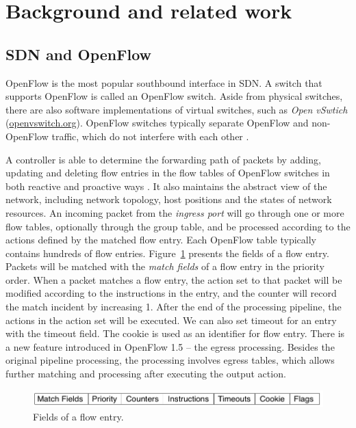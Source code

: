 \documentclass[conference]{IEEEtran}
\begin{document}
\section{Background and related work}
\subsection{SDN and OpenFlow}
\label{SDN and OpenFlow}
OpenFlow is the most popular southbound interface in SDN. A switch that supports OpenFlow is called an OpenFlow switch. Aside from physical switches, there are also software implementations of virtual switches, such as \textit{Open vSwtich} (\url{openvswitch.org}). OpenFlow switches typically separate OpenFlow and non-OpenFlow traffic, which do not interfere with each other \cite{HP_SPEC}.

A controller is able to determine the forwarding path of packets by adding, updating and deleting flow entries in the flow tables of OpenFlow switches in both reactive and proactive ways \cite{OF_SPEC}. It also maintains the abstract view of the network, including network topology, host positions and the states of network resources. An incoming packet from the \textit{ingress port} will go through one or more flow tables, optionally through the group table, and be processed according to the actions defined by the matched flow entry. Each OpenFlow table typically contains hundreds of flow entries. Figure~\ref{FE_Col} presents the fields of a flow entry. Packets will be matched with the \textit{match fields} of a flow entry in the priority order. When a packet matches a flow entry, the action set to that packet will be modified according to the instructions in the entry, and the counter will record the match incident by increasing 1. After the end of the processing pipeline, the actions in the action set will be executed. We can also set timeout for an entry with the timeout field. The cookie is used as an identifier for flow entry. There is a new feature introduced in OpenFlow 1.5 -- the egress processing. Besides the original pipeline processing, the processing involves egress tables, which allows further matching and processing after executing the output action\cite{OF_SPEC}. 

\begin{figure}[ht]
\begin{center} 
\includegraphics[width=1\linewidth]{figures/columns_of_flow_entry.png}
\end{center}
\caption{Fields of a flow entry.}
\label{FE_Col}
\end{figure}
\end{document}
